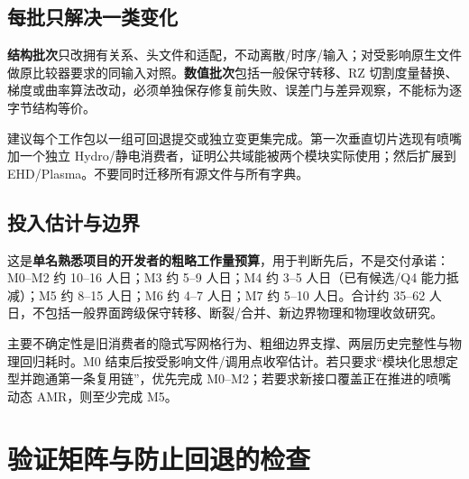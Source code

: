 \documentclass[UTF8,a4paper,11pt,fontset=fandol]{ctexart}
\begin{document}
\subsection{每批只解决一类变化}
\textbf{结构批次}只改拥有关系、头文件和适配，不动离散/时序/输入；对受影响原生文件做原比较器要求的同输入对照。\textbf{数值批次}包括一般保守转移、RZ 切割度量替换、梯度或曲率算法改动，必须单独保存修复前失败、误差门与差异观察，不能标为逐字节结构等价。

建议每个工作包以一组可回退提交或独立变更集完成。第一次垂直切片选现有喷嘴加一个独立 Hydro/静电消费者，证明公共域能被两个模块实际使用；然后扩展到 EHD/Plasma。不要同时迁移所有源文件与所有字典。

\subsection{投入估计与边界}
这是\textbf{单名熟悉项目的开发者的粗略工作量预算}，用于判断先后，不是交付承诺：M0--M2 约 10--16 人日；M3 约 5--9 人日；M4 约 3--5 人日（已有候选/Q4 能力抵减）；M5 约 8--15 人日；M6 约 4--7 人日；M7 约 5--10 人日。合计约 35--62 人日，不包括一般界面跨级保守转移、断裂/合并、新边界物理和物理收敛研究。

主要不确定性是旧消费者的隐式写网格行为、粗细边界支撑、两层历史完整性与物理回归耗时。M0 结束后按受影响文件/调用点收窄估计。若只要求“模块化思想定型并跑通第一条复用链”，优先完成 M0--M2；若要求新接口覆盖正在推进的喷嘴动态 AMR，则至少完成 M5。

\clearpage
\section{验证矩阵与防止回退的检查}
\end{document}
